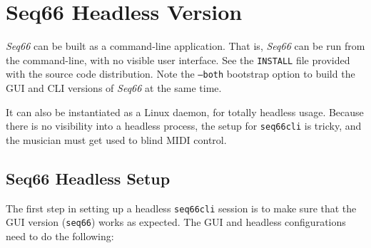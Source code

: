 %
%
%

\section{Seq66 Headless Version}
\label{sec:headless}

   \textsl{Seq66} can be built as a command-line application.
   That is, \textsl{Seq66}
   can be run from the command-line, with no visible user interface.
   See the \texttt{INSTALL} file provided with the source code distribution.
   Note the \texttt{--both} bootstrap option to build the GUI and CLI
   versions of \textsl{Seq66} at the same time.

   It can also be instantiated as a Linux daemon, for totally headless usage.
   Because there is no visibility into a headless process, the
   setup for \texttt{seq66cli} is tricky, and the musician must get
   used to blind MIDI control.

\subsection{Seq66 Headless Setup}
\label{subsec:headless_setup}

   The first step in setting up a headless \texttt{seq66cli} session is
   to make sure that the GUI version (\texttt{seq66}) works as expected.
   The GUI and headless configurations need to do the following:
   
